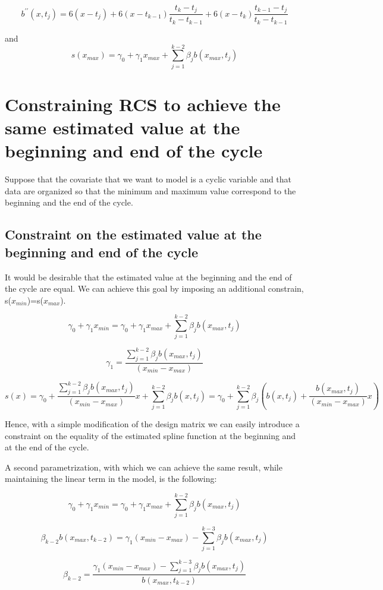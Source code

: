 \documentclass{article}
\begin{document}
$$b^{\prime\prime}(x, t_j)=6(x-t_j)  +  6(x-t_{k-1}) \frac{t_k-t_j}{t_k-t_{k-1}} + 6(x-t_k) \frac{t_{k-1}-t_j}{t_k-t_{k-1}}$$

and $$s(x_{max})=\gamma_0+\gamma_1 x_{max}+\sum_{j=1}^{k-2}\beta_j b(x_{max}, t_j)$$

\section{Constraining RCS to achieve the same estimated value at the beginning and end of the cycle}

Suppose that the covariate that we want to model is a cyclic variable and that data are organized so that the minimum and maximum value correspond to the beginning and the end of the cycle. 

\subsection{Constraint on the estimated value at the beginning and end of the cycle}
It would be desirable that the estimated value at the beginning and the end of the cycle are equal. 
We can achieve this goal by imposing an additional constrain, s($x_{min}$)=s($x_{max}$).


$$\gamma_0+\gamma_1 x_{min}=\gamma_0+\gamma_1 x_{max}+\sum_{j=1}^{k-2}\beta_j b(x_{max}, t_j)$$

$$\gamma_1= \frac{\sum_{j=1}^{k-2}\beta_j b(x_{max}, t_j)}{ (x_{min}-x_{max})}$$


$$s(x)=\gamma_0+\frac{\sum_{j=1}^{k-2}\beta_j b(x_{max}, t_j)}{ (x_{min}-x_{max})} x + \sum_{j=1}^{k-2}\beta_j b(x, t_j)
= \gamma_0+ \sum_{j=1}^{k-2}\beta_j \left(b(x, t_j) + \frac{b(x_{max}, t_j)}{ (x_{min}-x_{max})} x \right)$$


Hence, with a simple modification of the design matrix we can easily introduce a constraint on the equality of the estimated spline function at the beginning and at the end of the cycle.

A second parametrization, with which we can achieve the same result, while maintaining the linear term in the model, is the following:

$$\gamma_0+\gamma_1 x_{min}=\gamma_0+\gamma_1 x_{max}+\sum_{j=1}^{k-2}\beta_j b(x_{max}, t_j)$$

$$\beta_{k-2} b(x_{max}, t_{k-2})= \gamma_1 (x_{min}-x_{max}) - \sum_{j=1}^{k-3}\beta_j b(x_{max}, t_j)$$

$$\beta_{k-2}= \frac{\gamma_1 (x_{min}-x_{max}) - \sum_{j=1}^{k-3}\beta_j b(x_{max}, t_j)}{ b(x_{max}, t_{k-2})}$$
\end{document}

